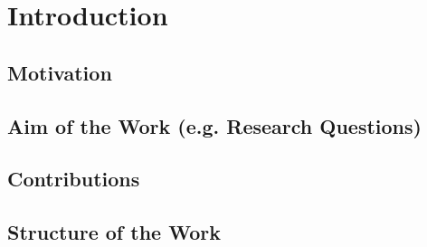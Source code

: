 \documentclass[draft,final]{vutinfth} %
\begin{document}
\frontmatter %

\addstatementpage

\begin{danksagung*}
\end{danksagung*}

\begin{acknowledgements*}
\end{acknowledgements*}

\begin{kurzfassung}
\end{kurzfassung}

\begin{abstract}
\end{abstract}


\tableofcontents %

\mainmatter



\chapter{Introduction}
\section{Motivation}
\section{Aim of the Work (e.g. Research Questions)}
\section{Contributions}
\section{Structure of the Work}
\end{document}
